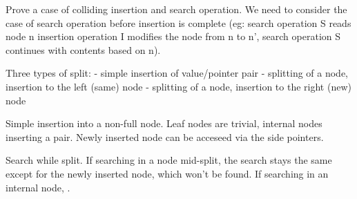 
Prove a case of colliding insertion and search operation. We need to consider the case of search operation before insertion is complete (eg: search operation S reads node n insertion operation I modifies the node from n to n', search operation S continues with contents based on n).

Three types of split:
- simple insertion of value/pointer pair
- splitting of a node, insertion to the left (same) node
- splitting of a node, insertion to the right (new) node

Simple insertion into a non-full node. Leaf nodes are trivial, internal nodes inserting a pair. Newly inserted node can be acceseed via the side pointers.

Search while split. If searching in a node mid-split, the search stays the same except for the newly inserted node, which won't be found. If searching in an internal node, . 

